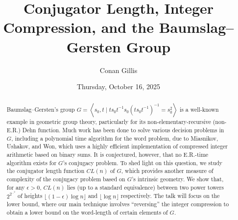 \documentclass{UAmathtalk}
\author{Conan Gillis}
\title{Conjugator Length, Integer Compression, and the Baumslag–Gersten Group}
\date{Thursday, October 16, 2025}
\begin{document}
\maketitle

\begin{abstract}
Baumslag–Gersten's group $G=\left\langle s_0, t \mid  ts_0t^{-1}  s_0(ts_0t^{-1})^{-1}=s_0^2 \right\rangle$ is a well-known example in geometric group theory, particularly for its non-elementary-recursive (non-E.R.) Dehn function. Much work has been done to solve various decision problems in $G$, including a polynomial time algorithm for the word problem, due to Miasnikov, Ushakov, and Won, which uses a highly efficient implementation of compressed integer arithmetic based on binary sums. It is conjectured, however, that no E.R.-time algorithm exists for $G$'s conjugacy problem. To shed light on this question, we study the conjugator length function $CL(n)$ of $G$, which provides another measure of complexity of the conjugacy problem based on $G$'s intrinsic geometry. We show that, for any $\epsilon>0$, $CL(n)$ lies (up to a standard equivalence) between two power towers $2^{2^{\cdots^2}}$  of heights $ \lfloor (1-\epsilon)\log n\rfloor$ and $ \lfloor\log n\rfloor$ respectively. The talk will focus on the lower bound, where our main technique involves ``reversing'' the integer compression to obtain a lower bound on the word-length of certain elements of $G$. 
\end{abstract}
\end{document}
